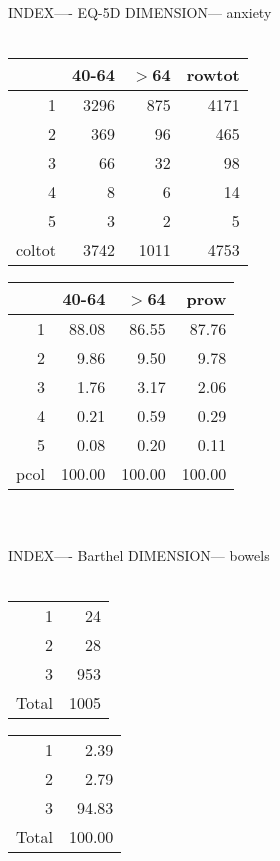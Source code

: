 \documentclass[11pt]{article}
\begin{document}
\\\\ 
INDEX---- EQ-5D DIMENSION--- anxiety 
 \\\\ 
% 
\begin{tabular}{rrr|r}
  \hline
 & 40-64 & $>$64 & rowtot \\ 
  \hline
1 & 3296 & 875 & 4171 \\ 
  2 & 369 & 96 & 465 \\ 
  3 & 66 & 32 & 98 \\ 
  4 & 8 & 6 & 14 \\ 
  5 & 3 & 2 & 5 \\ 
  coltot & 3742 & 1011 & 4753 \\ 
   \hline
\end{tabular}
% 
\begin{tabular}{rrr|r}
  \hline
 & 40-64 & $>$64 & prow \\ 
  \hline
1 & 88.08 & 86.55 & 87.76 \\ 
  2 & 9.86 & 9.50 & 9.78 \\ 
  3 & 1.76 & 3.17 & 2.06 \\ 
  4 & 0.21 & 0.59 & 0.29 \\ 
  5 & 0.08 & 0.20 & 0.11 \\ 
  pcol & 100.00 & 100.00 & 100.00 \\ 
   \hline
\end{tabular}
\\\\ 
INDEX---- Barthel DIMENSION--- bowels 
 \\\\ 
% 
\begin{tabular}{rr}
   \hline
1 &  24 \\ 
  2 &  28 \\ 
  3 & 953 \\ 
  Total & 1005 \\ 
   \hline
\end{tabular}
% 
\begin{tabular}{rr}
   \hline
1 & 2.39 \\ 
  2 & 2.79 \\ 
  3 & 94.83 \\ 
  Total & 100.00 \\ 
   \hline
\end{tabular}
\end{document}
